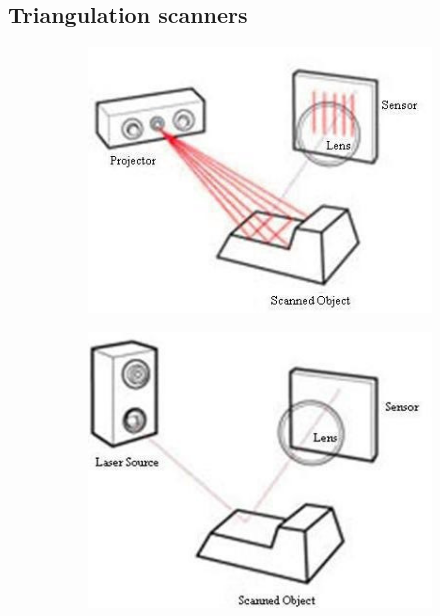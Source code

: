 \subsection{Triangulation scanners}

\begin{figure}[H]
	\begin{subfigure}[b]{.33\textwidth}
	  \centering
	  \includegraphics[width=.9\linewidth]{images/structured-light-scan}
	\end{subfigure}%
	\begin{subfigure}[b]{.33\textwidth}
	  \centering
	  \includegraphics[width=.9\linewidth]{images/triangulate-laser-scan}
	\end{subfigure}
	\begin{subfigure}[b]{.33\textwidth}
	  \centering
		\begin{tikzpicture}[scale=2.5]


\end{tikzpicture}
\end{subfigure}
\end{figure}
